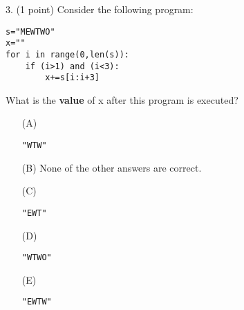 \documentclass{article}
\begin{document}
\noindent
\begin{minipage}{\textwidth}
3. (1 point)
Consider the following program:
\begin{verbatim}
s="MEWTWO"
x=""
for i in range(0,len(s)):
    if (i>1) and (i<3):
        x+=s[i:i+3]

\end{verbatim}
What is the \textbf{value} of x after this program is executed?

\begin{enumerate}
\item[(A)]
\begin{verbatim}"WTW"\end{verbatim}

\item[(B)]
None of the other answers are correct.

\item[(C)]
\begin{verbatim}"EWT"\end{verbatim}

\item[(D)]
\begin{verbatim}"WTWO"\end{verbatim}

\item[(E)]
\begin{verbatim}"EWTW"\end{verbatim}

\end{enumerate}
\end{minipage}
\vspace{10em}
\filbreak\vfil{}\vfilneg
\end{document}
